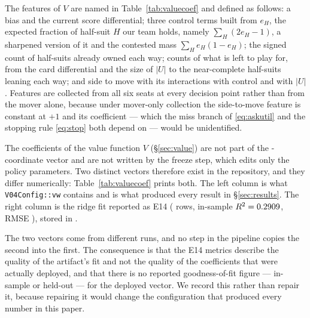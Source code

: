 The \numValueFeats{} features of $V$ are named in Table~\ref{tab:valuecoef} and
defined as follows: a bias and the current score differential; three control
terms built from $e_H$, the expected fraction of half-suit $H$ our team holds,
namely $\sum_H (2e_H - 1)$, a sharpened version of it and the contested mass
$\sum_H e_H(1-e_H)$; the signed count of half-suits already owned each way;
counts of what is left to play for, from the card differential and the size of
$|U|$ to the near-complete half-suits leaning each way; and side to move with its
interactions with control and with $|U|$. Features are collected from all six
seats at every decision point rather than from the mover alone, because under
mover-only collection the side-to-move feature is constant at $+1$ and its
coefficient --- which the miss branch of \eqref{eq:askutil} and the stopping rule
\eqref{eq:stop} both depend on --- would be unidentified.

The \numValueFeats{} coefficients of the value function $V$ (\S\ref{sec:value})
are not part of the \numParams{}-coordinate vector and are not written by the
freeze step, which edits only the policy parameters. Two distinct vectors
therefore exist in the repository, and they differ numerically:
Table~\ref{tab:valuecoef} prints both. The left column is what
\texttt{V04Config::vw} contains and is what produced every result in
\S\ref{sec:results}. The right column is the ridge fit reported as E14
(\numValueRows{} rows, in-sample $R^2 = 0.2909$, RMSE \numValueRmse{}),
stored in .

The two vectors come from different runs, and no step in the pipeline copies the
second into the first. The consequence is that the
E14 metrics describe the quality of the artifact's fit and not the quality of the
coefficients that were actually deployed, and that there is no reported
goodness-of-fit figure --- in-sample or held-out --- for the deployed vector. We
record this rather than repair it, because repairing it would change the
configuration that produced every number in this paper.

